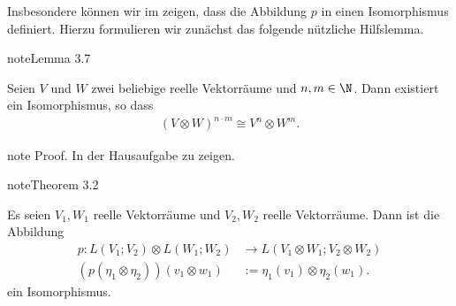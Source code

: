 \documentclass[letterpaper,10pt,german]{jupyterBook}
\begin{document}
\sphinxAtStartPar
Insbesondere können wir im  zeigen, dass die Abbildung \(p\) in {\hyperref[\detokenize{vektoranalysis/tensor:lem:LISO}]{}} einen Isomorphismus definiert.
Hierzu formulieren wir zunächst das folgende nützliche Hilfslemma.
\label{vektoranalysis/tensor:lem:isomorphieKartesischesProdukt}
\begin{sphinxadmonition}{note}{Lemma 3.7}



\sphinxAtStartPar
Seien \(V\) und \(W\) zwei beliebige reelle Vektorräume und \(n,m \in \N\).
Dann existiert ein Isomorphismus, so dass
\begin{equation*}
\begin{split}(V \otimes W)^{n\cdot m} \cong V^n \otimes W^m.\end{split}
\end{equation*}\end{sphinxadmonition}

\begin{sphinxadmonition}{note}
\sphinxAtStartPar
Proof. In der Hausaufgabe zu zeigen.
\end{sphinxadmonition}
\label{vektoranalysis/tensor:thm:pIsomorphismus}
\begin{sphinxadmonition}{note}{Theorem 3.2}



\sphinxAtStartPar
Es seien \(V_1, W_1\) reelle  Vektorräume und \(V_2, W_2\)  reelle Vektorräume.
Dann ist die Abbildung
\begin{equation*}
\begin{split}p:L(V_1; V_2)\otimes L(W_1; W_2) &\rightarrow L(V_1\otimes W_1; V_2\otimes W_2)\\
(p(\eta_1\otimes\eta_2))(v_1\otimes w_1)&:= \eta_1(v_1) \otimes \eta_2(w_1).\end{split}
\end{equation*}
\sphinxAtStartPar
ein Isomorphismus.
\end{sphinxadmonition}
\end{document}
